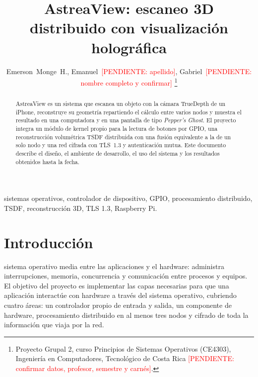\documentclass[journal]{IEEEtran}
\newcommand{\pendiente}[1]{\textcolor{red}{[PENDIENTE: #1]}}
\begin{document}
\title{AstreaView: escaneo 3D distribuido con visualización holográfica}

\author{Emerson~Monge~H.,
        Emanuel~\pendiente{apellido},
        Gabriel~\pendiente{nombre completo y confirmar}%
\thanks{Proyecto Grupal 2, curso Principios de Sistemas Operativos (CE4303),
Ingeniería en Computadores, Tecnológico de Costa Rica \pendiente{confirmar datos,
profesor, semestre y carnés}.}}

\maketitle

\begin{abstract}
AstreaView es un sistema que escanea un objeto con la cámara TrueDepth de un
iPhone, reconstruye su geometría repartiendo el cálculo entre varios nodos y
muestra el resultado en una computadora y en una pantalla de tipo
\emph{Pepper's Ghost}. El proyecto integra un módulo de kernel propio para la
lectura de botones por GPIO, una reconstrucción volumétrica TSDF distribuida con
una fusión equivalente a la de un solo nodo y una red cifrada con TLS~1.3 y
autenticación mutua. Este documento describe el diseño, el ambiente de
desarrollo, el uso del sistema y los resultados obtenidos hasta la fecha.
\end{abstract}

\begin{IEEEkeywords}
sistemas operativos, controlador de dispositivo, GPIO, procesamiento
distribuido, TSDF, reconstrucción 3D, TLS 1.3, Raspberry Pi.
\end{IEEEkeywords}

\section{Introducción}

 sistema operativo media entre las aplicaciones y el hardware:
administra interrupciones, memoria, concurrencia y comunicación entre procesos y
equipos. El objetivo del proyecto es implementar las capas necesarias para que
una aplicación interactúe con hardware a través del sistema operativo, cubriendo
cuatro áreas: un controlador propio de entrada y salida, un componente de
hardware, procesamiento distribuido en al menos tres nodos y cifrado de toda la
información que viaja por la red.
\end{document}
